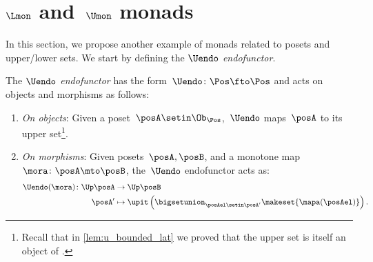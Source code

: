 %

\section{$\Lmon$ and~$\Umon$ monads}
In this section, we propose another example of monads related to posets and upper/lower sets.
We start by defining the \emph{$\Uendo$ endofunctor}.
\begin{definition}
    \label{def:Uendo}
    The \emph{$\Uendo$ endofunctor} has the form~$\Uendo \colon \Pos \fto \Pos$ and acts on objects and morphisms as follows:
    \begin{enumerate}
        \item \emph{On objects}: Given a poset~$\posA \setin \Ob_\Pos$,~$\Uendo$ maps~$\posA$ to its upper set\footnote{Recall that in \cref{lem:u_bounded_lat} we proved that the upper set is itself an object of \Pos.
              }.
        \item \emph{On morphisms}: Given posets~$\posA,\posB$, and a monotone map~$\mora \colon \posA\mto \posB$, the~$\Uendo$ endofunctor acts as:
              \begin{equation}
                  \begin{aligned}
                      \Uendo(\mora)\colon \Up \posA & \to \Up \posB \\
                      \posA'                        & \mapsto \upit \left( \bigsetunion_{\posAel\setin \posA'} \makeset{\mapa(\posAel)}\right).
                  \end{aligned}
              \end{equation}
    \end{enumerate}
\end{definition}

